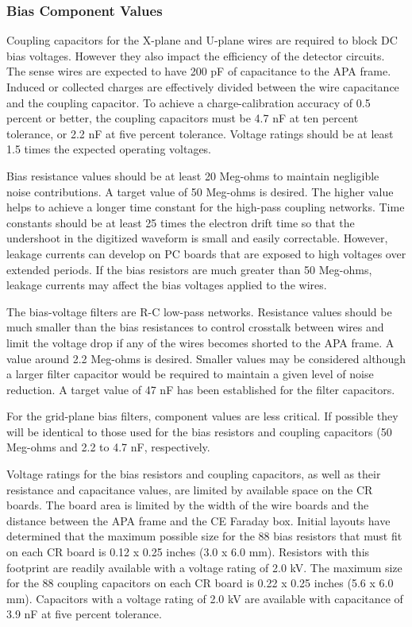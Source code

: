\subsubsection{Bias Component Values}
\label{subsec:bias_comp_values}

Coupling capacitors for the X-plane and U-plane wires are required to block DC bias voltages.
However they also impact the efficiency of the detector circuits.
The sense wires are expected to have 200 pF of capacitance to the APA frame.
Induced or collected charges are effectively divided between the wire capacitance and the coupling capacitor.
To achieve a charge-calibration accuracy of 0.5 percent or better,
the coupling capacitors must be 4.7 nF at ten percent tolerance, or 2.2 nF at five percent tolerance.
Voltage ratings should be at least 1.5 times the expected operating voltages.

Bias resistance values should be at least 20 Meg-ohms to maintain negligible noise contributions.
A target value of 50 Meg-ohms is desired.
The higher value helps to achieve a longer time constant for the high-pass coupling networks.
Time constants should be at least 25 times the electron drift time so that the undershoot in the digitized waveform
is small and easily correctable.
However, leakage currents can develop on PC boards that are exposed to high voltages over extended periods.
If the bias resistors are much greater than 50 Meg-ohms, leakage currents may affect the bias voltages applied to the wires.

The bias-voltage filters are R-C low-pass networks.
Resistance values should be much smaller than the bias resistances to control crosstalk between wires
and limit the voltage drop if any of the wires becomes shorted to the APA frame.
A value around 2.2 Meg-ohms is desired.
Smaller values may be considered although a larger filter capacitor would be required to maintain a given level of noise reduction.
A target value of 47 nF has been established for the filter capacitors.

For the grid-plane bias filters, component values are less critical.
If possible they will be identical to those used for the bias resistors and coupling capacitors
(50 Meg-ohms and 2.2 to 4.7 nF, respectively.

Voltage ratings for the bias resistors and coupling capacitors, as well as their resistance and capacitance values,
are limited by available space on the CR boards.
The board area is limited by the width of the wire boards and the distance between the APA frame and the CE Faraday box.
Initial layouts have determined that the maximum possible size for the 88 bias resistors that must fit on each CR board
is 0.12 x 0.25 inches (3.0 x 6.0 mm).
Resistors with this footprint are readily available with a voltage rating of 2.0 kV.
The maximum size for the 88 coupling capacitors on each CR board is 0.22 x 0.25 inches (5.6 x 6.0 mm).
Capacitors with a voltage rating of 2.0 kV are available with capacitance of 3.9 nF at five percent tolerance.

